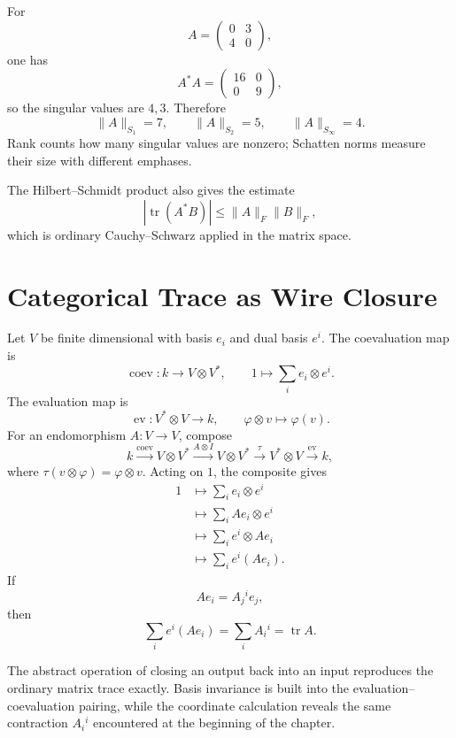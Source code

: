 For
\[
  A=
  \begin{pmatrix}
    0&3\\
    4&0
  \end{pmatrix},
\]
one has
\[
  A^*A=
  \begin{pmatrix}
    16&0\\
    0&9
  \end{pmatrix},
\]
so the singular values are \(4,3\).  Therefore
\[
  \|A\|_{S_1}=7,
  \qquad
  \|A\|_{S_2}=5,
  \qquad
  \|A\|_{S_\infty}=4.
\]
Rank counts how many singular values are nonzero; Schatten norms measure their size with different emphases.

The Hilbert--Schmidt product also gives the estimate
\[
  |\operatorname{tr}(A^*B)|
  \le\|A\|_F\|B\|_F,
\]
which is ordinary Cauchy--Schwarz applied in the matrix space.

\section{Categorical Trace as Wire Closure}

Let \(V\) be finite dimensional with basis \(e_i\) and dual basis \(e^i\).  The coevaluation map is
\[
  \operatorname{coev}:k\to V\otimes V^*,
  \qquad
  1\longmapsto\sum_i e_i\otimes e^i.
\]
The evaluation map is
\[
  \operatorname{ev}:V^*\otimes V\to k,
  \qquad
  \varphi\otimes v\longmapsto\varphi(v).
\]
For an endomorphism \(A:V\to V\), compose
\[
  k
  \xrightarrow{\operatorname{coev}}
  V\otimes V^*
  \xrightarrow{A\otimes I}
  V\otimes V^*
  \xrightarrow{\tau}
  V^*\otimes V
  \xrightarrow{\operatorname{ev}}
  k,
\]
where \(\tau(v\otimes\varphi)=\varphi\otimes v\).  Acting on \(1\), the composite gives
\[
\begin{aligned}
  1
  &\longmapsto
  \sum_i e_i\otimes e^i\\
  &\longmapsto
  \sum_i Ae_i\otimes e^i\\
  &\longmapsto
  \sum_i e^i\otimes Ae_i\\
  &\longmapsto
  \sum_i e^i(Ae_i).
\end{aligned}
\]
If
\[
  Ae_i=A_j{}^i e_j,
\]
then
\[
  \sum_i e^i(Ae_i)
  =\sum_iA_i{}^i
  =\operatorname{tr}A.
\]

The abstract operation of closing an output back into an input reproduces the ordinary matrix trace exactly.  Basis invariance is built into the evaluation--coevaluation pairing, while the coordinate calculation reveals the same contraction \(A_i{}^i\) encountered at the beginning of the chapter.